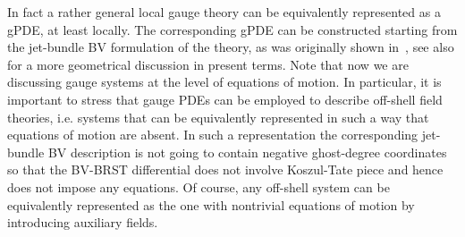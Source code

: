 \documentclass[a4paper,12pt]{article}
\numberwithin{equation}{section} %
\begin{document}
In fact a rather general local gauge theory can be equivalently represented as a gPDE, at least locally. The corresponding gPDE can be constructed starting from the jet-bundle BV formulation of the theory, as was originally shown in~\cite{Barnich:2010sw}, see also \cite{Grigoriev:2019ojp} for a more geometrical discussion in present terms. Note that now we are discussing gauge systems at the level of equations of motion. In particular, it is important to stress that gauge PDEs can be employed to describe off-shell field theories, i.e. systems that can be equivalently represented in such a way that equations of motion are absent. In such a representation the corresponding jet-bundle BV description is not going to contain negative ghost-degree coordinates so that the BV-BRST differential does not involve Koszul-Tate piece and hence does not impose any equations. Of course, any off-shell system can be equivalently represented as the one with nontrivial equations of motion by introducing auxiliary fields.
\end{document}
